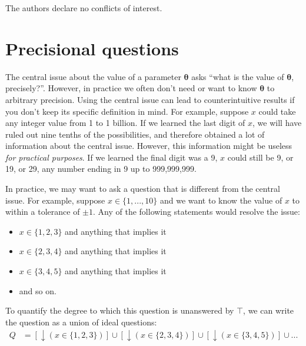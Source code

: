 \documentclass[entropy,article,accept,oneauthor,pdftex,10pt,a4paper]{mdpi}
\newcommand{\x}{\boldsymbol{\theta}}
\begin{document}



The authors declare no conflicts of interest.

%
\makeatletter
\renewcommand\@biblabel[1]{#1. }
\makeatother





\appendix
\section{Precisional questions}

The central issue about the value of a parameter $\x$ asks
``what is the value of $\x$, precisely?''. However, in practice we often
don't need or want to know $\x$ to arbitrary precision. Using the central
issue can lead to counterintuitive results if you don't keep its specific
definition in mind. For example, suppose $x$ could take any integer value
from 1 to 1 billion. If we learned the last digit of $x$, we
will have ruled out nine tenths of the possibilities, and therefore obtained
a lot of information about the central issue. However,
this information might be useless {\em for practical purposes}.
If we learned the final
digit was a 9, $x$ could still be 9, or 19, or 29, any number ending in 9
up to 999,999,999.

In practice, we may
want to ask a question that is different from the central issue.
For example, suppose $x \in \{1, ..., 10\}$ and
we want to know the value of $x$ to within a tolerance
of $\pm 1$. Any of the following statements would
resolve the issue:
\begin{itemize}
\item $x \in \{1, 2, 3\}$ and anything that implies it
\item $x \in \{2, 3, 4\}$ and anything that implies it
\item $x \in \{3, 4, 5\}$ and anything that implies it
\item and so on.
\end{itemize}
To quantify the degree to which this question is unanswered by
$\top$, we can write the question as a union of ideal questions:
\begin{align}
Q &= \left[\downarrow (x \in \{1, 2, 3\})\right] \cup
     \left[\downarrow (x \in \{2, 3, 4\})\right] \cup
     \left[\downarrow (x \in \{3, 4, 5\})\right] \cup ...
\end{align}
\end{document}
